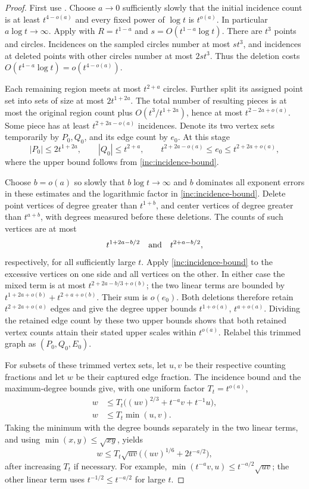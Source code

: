 \begin{proof}
First use . Choose \(a\to0\) sufficiently
slowly that the initial incidence count is at least \(t^{4-o(a)}\)
and every fixed power of \(\log t\) is \(t^{o(a)}\). In particular
\(a\log t\to\infty\). Apply  with
\(R=t^{1-a}\) and \(s=O(t^{1-a}\log t)\). There are \(t^3\)
points and circles. Incidences on the sampled circles number at most
\(s t^3\), and incidences at deleted points with other circles number
at most \(2s t^3\). Thus the deletion costs
\(O(t^{4-a}\log t)=o(t^{4-o(a)})\).

Each remaining region meets at most \(t^{2+a}\) circles. Further split
its assigned point set into sets of size at most \(2t^{1+2a}\).
The total number of resulting pieces is at most the original region
count plus \(O(t^3/t^{1+2a})\), hence at most
\(t^{2-2a+o(a)}\). Some piece has at least
\(t^{2+2a-o(a)}\) incidences. Denote its two vertex sets temporarily
by \(P_0,Q_0\), and its edge count by \(e_0\). At this stage
\[
 |P_0|\le 2t^{1+2a},\qquad |Q_0|\le t^{2+a},\qquad
 t^{2+2a-o(a)}\le e_0\le t^{2+2a+o(a)},
\]
where the upper bound follows from \eqref{inc:incidence-bound}.

Choose \(b=o(a)\) so slowly that \(b\log t\to\infty\) and \(b\)
dominates all exponent errors in these estimates and the logarithmic
factor in \eqref{inc:incidence-bound}. Delete point vertices of degree
greater than \(t^{1+b}\), and center vertices of degree greater than
\(t^{a+b}\), with degrees measured before these deletions. The counts
of such vertices are at most
\[
 t^{1+2a-b/2}\quad\hbox{and}\quad t^{2+a-b/2},
\]
respectively, for all sufficiently large \(t\). Apply
\eqref{inc:incidence-bound} to the excessive vertices on one side and
all vertices on the other. In either case the mixed term is at most
\(t^{2+2a-b/3+o(b)}\); the two linear terms are bounded by
\(t^{1+2a+o(b)}+t^{2+a+o(b)}\). Their sum is \(o(e_0)\).
Both deletions therefore retain \(t^{2+2a+o(a)}\) edges and give
the degree upper bounds \(t^{1+o(a)}\), \(t^{a+o(a)}\).
Dividing the retained edge count by these two upper bounds shows that
both retained vertex counts attain their stated upper scales within
\(t^{o(a)}\). Relabel this trimmed graph as \((P_0,Q_0,E_0)\).

For subsets of these trimmed vertex sets, let \(u,v\) be their
respective counting fractions and let \(w\) be their captured edge
fraction. The incidence bound and the maximum-degree bounds give,
with one uniform factor \(T_t=t^{o(a)}\),
\begin{align}
 w&\le T_t\bigl((uv)^{2/3}+t^{-a}v+t^{-1}u\bigr),
 \label{inc:preliminary-expansion}\\
 w&\le T_t\min(u,v).\nonumber
\end{align}
Taking the minimum with the degree bounds separately in the two linear
terms, and using \(\min(x,y)\le\sqrt{xy}\), yields
\begin{equation}\label{inc:preliminary-square-root}
 w\le T_t\sqrt{uv}
       \bigl((uv)^{1/6}+2t^{-a/2}\bigr),
\end{equation}
after increasing \(T_t\) if necessary. For example,
\(\min(t^{-a}v,u)\le t^{-a/2}\sqrt{uv}\); the other linear term
uses \(t^{-1/2}\le t^{-a/2}\) for large \(t\).


\end{proof}
